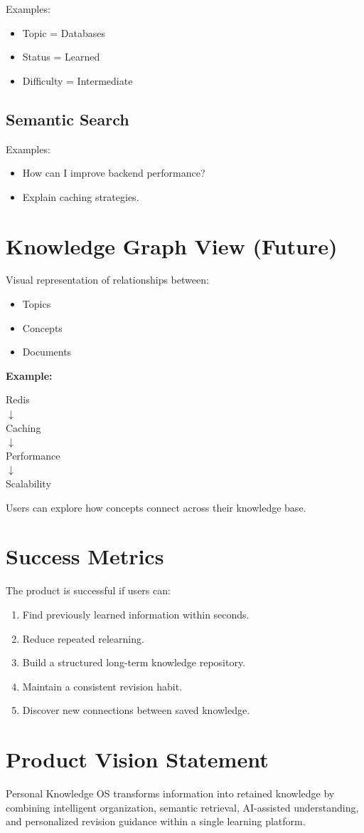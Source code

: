 \documentclass[11pt]{article}
\begin{document}
Examples:
\begin{itemize}[nosep]
    \item Topic = Databases
    \item Status = Learned
    \item Difficulty = Intermediate
\end{itemize}

\subsection{Semantic Search}

Examples:
\begin{itemize}[nosep]
    \item How can I improve backend performance?
    \item Explain caching strategies.
\end{itemize}

\section{Knowledge Graph View (Future)}

Visual representation of relationships between:

\begin{itemize}[nosep]
    \item Topics
    \item Concepts
    \item Documents
\end{itemize}

\textbf{Example:}

\begin{center}
Redis \\
$\downarrow$ \\
Caching \\
$\downarrow$ \\
Performance \\
$\downarrow$ \\
Scalability
\end{center}

Users can explore how concepts connect across their knowledge base.

\section{Success Metrics}

The product is successful if users can:

\begin{enumerate}[nosep]
    \item Find previously learned information within seconds.
    \item Reduce repeated relearning.
    \item Build a structured long-term knowledge repository.
    \item Maintain a consistent revision habit.
    \item Discover new connections between saved knowledge.
\end{enumerate}

\section{Product Vision Statement}

Personal Knowledge OS transforms information into retained knowledge by combining intelligent organization, semantic retrieval, AI-assisted understanding, and personalized revision guidance within a single learning platform.
\end{document}
